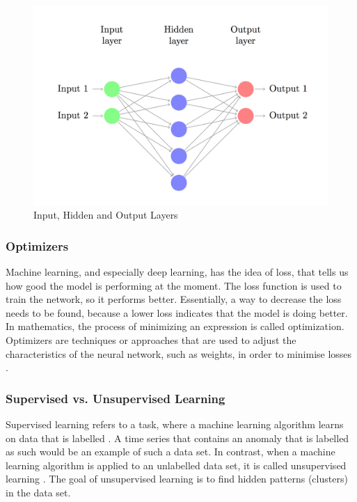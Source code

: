 \begin{figure}[h]
	\centering
	\includegraphics[scale=0.3]{Figures/layers}
	\decoRule
	\caption[Input, Hidden and Output Layers]{Input, Hidden and Output Layers \parencite{DennyBritz2015}}
	\label{fig:layers}
\end{figure}



\subsubsection{Optimizers} \label{optimizer}
Machine learning, and especially deep learning, has the idea of loss, that tells us how good the model is performing at the moment. The loss function is used to train the network, so it performs better. Essentially, a way to decrease the loss needs to be found, because a lower loss indicates that the model is doing better. In mathematics, the process of minimizing an expression is called optimization. Optimizers are techniques or approaches that are used to adjust the characteristics of the neural network, such as weights, in order to minimise losses \parencite{Doshi2019}.

\subsubsection{Supervised vs. Unsupervised Learning}
Supervised learning refers to a task, where a machine learning algorithm learns on data that is labelled \parencite{Russell2010}. A time series that contains an anomaly that is labelled as such would be an example of such a data set. In contrast, when a machine learning algorithm is applied to an unlabelled data set, it is called unsupervised learning \parencite{Hinton1999}. The goal of unsupervised learning is to find hidden patterns (clusters) in the data set.



